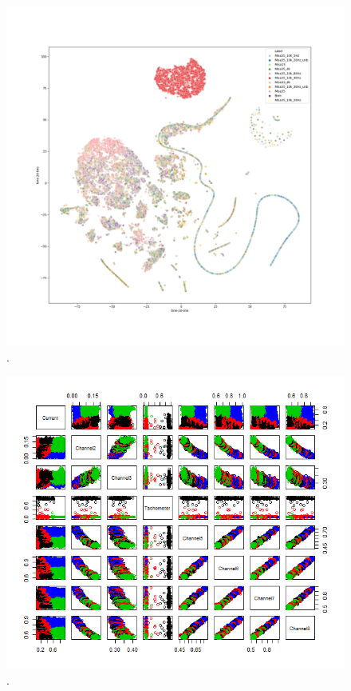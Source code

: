 \begin{figure}[H]
    \caption{.}
    \begin{center}
        \includegraphics[scale=.25]{resultados/img/fft-t-sne-1}
    \end{center}
    \label{fig:satelite_completo}
\end{figure}

\begin{figure}[H]
    \caption{.}
    \begin{center}
        \includegraphics[scale=.65]{resultados/img/kmeans2}
    \end{center}
    \label{fig:satelite_completo}
\end{figure}

